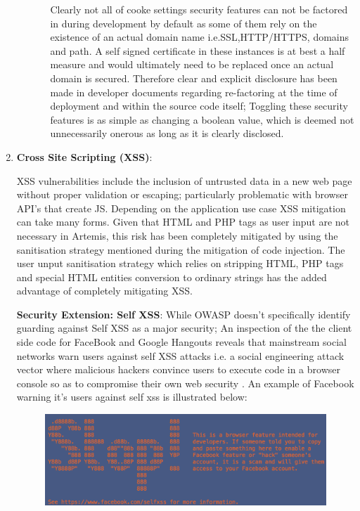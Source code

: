 \begin{enumerate}
\begin{enumerate}
\begin{enumerate}
\begin{itemize}
                \end{itemize}
                Clearly not all of cooke settings security features can not be factored in during development by default as some of them rely on the existence of an actual domain name i.e.SSL,HTTP/HTTPS, domains and path. A self signed certificate in these instances is at best a half measure and would ultimately need to be replaced once an actual domain is secured. Therefore clear and explicit disclosure has been made in developer documents regarding re-factoring at the time of deployment and within the source code itself; Toggling these security features is as simple as changing a boolean value, which is deemed not unnecessarily onerous as long as it is clearly disclosed.
        \end{enumerate}
    \end{enumerate}

    \item \textbf{Cross Site Scripting (XSS)}:
    
    XSS vulnerabilities include the inclusion of untrusted data in a new web page without proper validation or escaping; particularly problematic with browser API's that create JS. Depending on the application use case XSS mitigation can take many forms. Given that HTML and PHP tags as user input are not necessary in Artemis, this risk has been completely mitigated by using the sanitisation strategy mentioned during the mitigation of code injection. The user unput sanitisation strategy which relies on stripping HTML, PHP tags and   special HTML entities conversion to ordinary strings has the added advantage of completely mitigating XSS.
    
    \textbf{Security Extension: Self XSS}:
    While OWASP doesn't specifically identify guarding against Self XSS as a major security; An inspection of the  the client side code for FaceBook and Google Hangouts reveals that mainstream social networks warn users against self XSS attacks i.e. a social engineering attack vector where malicious hackers convince users to execute code in a browser console so as to compromise their own web security \cite{FaceBook}. An example of Facebook warning it's users against self xss is illustrated below:
    
    \begin{figure}[h]
    	\centering
    	\includegraphics[scale=0.75,right]{chapters/chapter03/figures/faceBook.png}
    	\label{faceBookSelfXSS}
    \end{figure}
    

\end{enumerate}
